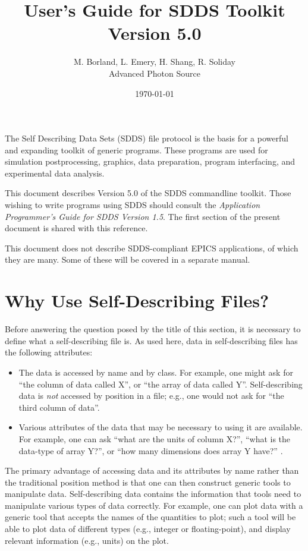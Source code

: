 \documentclass[11pt]{article}
\begin{document}
\title{User's Guide for SDDS Toolkit Version 5.0}
\author{M. Borland, L. Emery, H. Shang, R. Soliday\\Advanced Photon Source}
\date{\today}
\maketitle

The Self Describing Data Sets (SDDS) file protocol is the basis for a
powerful and expanding toolkit of generic programs. These
programs are used for simulation postprocessing, graphics, data
preparation, program interfacing, and experimental data analysis.

This document describes Version 5.0 of the SDDS commandline toolkit.
Those wishing to write programs using SDDS should consult the {\em
Application Programmer's Guide for SDDS Version 1.5}\cite{SDDS_AP1.5}.
The first section of the present document is shared with this
reference.

This document does not describe SDDS-compliant EPICS applications, of
which they are many. Some of these will be covered in a separate
manual.

\section{Why Use Self-Describing Files?}

Before answering the question posed by the title of this section, it
is necessary to define what a self-describing file is.  As used here,
data in self-describing files has the following attributes:
\begin{itemize}
\item The data is accessed by name and by class.  For example, one
 might ask for ``the column of data called X'', or ``the array of data
 called Y''.  Self-describing data is {\em not} accessed by position
 in a file; e.g., one would not ask for ``the third column of data''.
\item Various attributes of the data that may be necessary to using it
 are available.  For example, one can ask ``what are the units of
 column X?'', ``what is the data-type of array Y?'', or ``how many
 dimensions does array Y have?'' .
\end{itemize}

The primary advantage of accessing data and its attributes by name
rather than the traditional position method is that one can then
construct generic tools to manipulate data. Self-describing data
contains the information that tools need to manipulate various types
of data correctly.  For example, one can plot data with a generic tool
that accepts the names of the quantities to plot; such a tool will be
able to plot data of different types (e.g., integer or
floating-point), and display relevant information (e.g., units) on the
plot.
\end{document}

